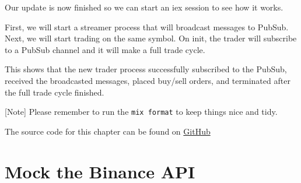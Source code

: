 \documentclass[
  oneside]{book}
\newenvironment{Shaded}{\begin{snugshade}}{\end{snugshade}}
\newcommand{\AttributeTok}[1]{\textcolor[rgb]{0.13,0.29,0.53}{#1}}
\newcommand{\CommentTok}[1]{\textcolor[rgb]{0.56,0.35,0.01}{\textit{#1}}}
\newcommand{\ErrorTok}[1]{\textcolor[rgb]{0.64,0.00,0.00}{\textbf{#1}}}
\newcommand{\ExtensionTok}[1]{#1}
\newcommand{\KeywordTok}[1]{\textcolor[rgb]{0.13,0.29,0.53}{\textbf{#1}}}
\newcommand{\NormalTok}[1]{#1}
\newcommand{\OperatorTok}[1]{\textcolor[rgb]{0.81,0.36,0.00}{\textbf{#1}}}
\newcommand{\PreprocessorTok}[1]{\textcolor[rgb]{0.56,0.35,0.01}{\textit{#1}}}
\newcommand{\SpecialStringTok}[1]{\textcolor[rgb]{0.31,0.60,0.02}{#1}}
\newcommand{\StringTok}[1]{\textcolor[rgb]{0.31,0.60,0.02}{#1}}
\begin{document}
Our update is now finished so we can start an iex session to see how it works.

First, we will start a streamer process that will broadcast messages
to PubSub. Next, we will start trading on the same symbol. On init, the trader will subscribe to a PubSub channel and it will make a full trade cycle.

\begin{Shaded}
\end{Shaded}

This shows that the new trader process successfully subscribed to the PubSub, received the broadcasted messages, placed buy/sell orders, and terminated after the full trade cycle finished.

{[}Note{]} Please remember to run the \texttt{mix\ format} to keep things nice and tidy.

The source code for this chapter can be found on \href{https://github.com/Cinderella-Man/hands-on-elixir-and-otp-cryptocurrency-trading-bot-source-code/tree/chapter_03}{GitHub}

\chapter{Mock the Binance API}\label{mock-the-binance-api}
\end{document}
